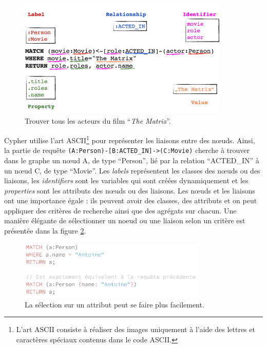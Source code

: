 		\begin{figure}[H]
			\centering
			\includegraphics[width=0.9\textwidth]{images/requeteNeo4j.png}
			\caption{Trouver tous les acteurs du film \enquote{\textit{The Matrix}}.\cite{grapheNeo4j}}
			\label{requeteNeo4j}
		\end{figure}

		Cypher utilise l'art ASCII\footnote{L'art ASCII consiste à réaliser des images uniquement à l'aide des lettres et caractères spéciaux contenus dans le code ASCII.\cite{Wikipedia_artASCII}} pour représenter les liaisons entre des nœuds. Ainsi, la partie de requête \texttt{(A:Person)-[B:ACTED\_IN]->(C:Movie)} cherche à trouver dans le graphe un nœud A, de type \enquote{Person}, lié par la relation \enquote{ACTED\_IN} à un nœud C, de type \enquote{Movie}. Les \textit{labels} représentent les classes des nœuds ou des liaisons, les \textit{identifiers} sont les variables qui sont créées dynamiquement et les \textit{properties} sont les attributs des nœuds ou des liaisons. Les nœuds et les liaisons ont une importance égale : ils peuvent avoir des classes, des attributs et on peut appliquer des critères de recherche ainsi que des agrégats sur chacun. Une manière élégante de sélectionner un noeud ou une liaison selon un critère est présentée dans la figure \ref{raccourciSelection}.\\

		\begin{figure}[H]
			\centering
			\includegraphics[width=0.8\textwidth]{images/shortSelect.png}
			\caption{La sélection sur un attribut peut se faire plus facilement.}
			\label{raccourciSelection}
		\end{figure}

